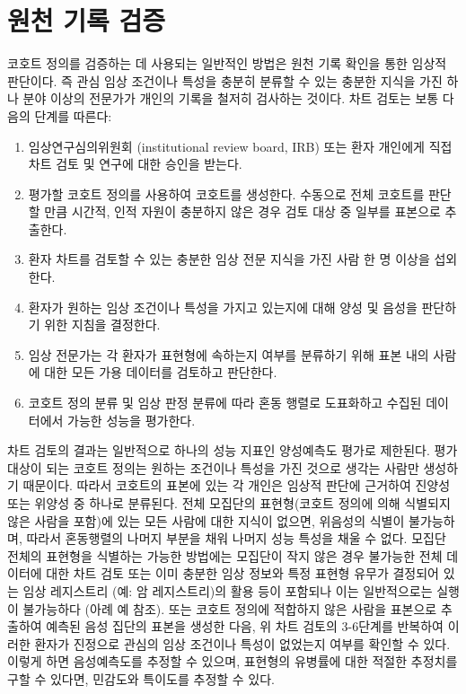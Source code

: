 \documentclass[11pt]{book}
\providecommand{\tightlist}{%
  \setlength{\itemsep}{0pt}\setlength{\parskip}{0pt}}
\theoremstyle{definition}
\theoremstyle{definition}
\theoremstyle{definition}
\theoremstyle{remark}
\begin{document}
\section{원천 기록 검증}\label{--}


코호트 정의를 검증하는 데 사용되는 일반적인 방법은 원천 기록 확인을 통한
임상적 판단이다. 즉 관심 임상 조건이나 특성을 충분히 분류할 수 있는
충분한 지식을 가진 하나 분야 이상의 전문가가 개인의 기록을 철저히
검사하는 것이다. 차트 검토는 보통 다음의 단계를 따른다:

\begin{enumerate}
\def\labelenumi{\arabic{enumi}.}
\tightlist
\item
  임상연구심의위원회 (institutional review board, IRB) 또는 환자
  개인에게 직접 차트 검토 및 연구에 대한 승인을 받는다.
\item
  평가할 코호트 정의를 사용하여 코호트를 생성한다. 수동으로 전체
  코호트를 판단할 만큼 시간적, 인적 자원이 충분하지 않은 경우 검토 대상
  중 일부를 표본으로 추출한다.
\item
  환자 차트를 검토할 수 있는 충분한 임상 전문 지식을 가진 사람 한 명
  이상을 섭외한다.
\item
  환자가 원하는 임상 조건이나 특성을 가지고 있는지에 대해 양성 및 음성을
  판단하기 위한 지침을 결정한다.
\item
  임상 전문가는 각 환자가 표현형에 속하는지 여부를 분류하기 위해 표본
  내의 사람에 대한 모든 가용 데이터를 검토하고 판단한다.
\item
  코호트 정의 분류 및 임상 판정 분류에 따라 혼동 행렬로 도표화하고
  수집된 데이터에서 가능한 성능을 평가한다.
\end{enumerate}

차트 검토의 결과는 일반적으로 하나의 성능 지표인 양성예측도 평가로
제한된다. 평가 대상이 되는 코호트 정의는 원하는 조건이나 특성을 가진
것으로 생각는 사람만 생성하기 때문이다. 따라서 코호트의 표본에 있는 각
개인은 임상적 판단에 근거하여 진양성 또는 위양성 중 하나로 분류된다.
전체 모집단의 표현형(코호트 정의에 의해 식별되지 않은 사람을 포함)에
있는 모든 사람에 대한 지식이 없으면, 위음성의 식별이 불가능하며, 따라서
혼동행렬의 나머지 부분을 채워 나머지 성능 특성을 채울 수 없다. 모집단
전체의 표현형을 식별하는 가능한 방법에는 모집단이 작지 않은 경우
불가능한 전체 데이터에 대한 차트 검토 또는 이미 충분한 임상 정보와 특정
표현형 유무가 결정되어 있는 임상 레지스트리 (예: 암 레지스트리)의 활용
등이 포함되나 이는 일반적으로는 실행이 불가능하다 (아례 예 참조). 또는
코호트 정의에 적합하지 않은 사람을 표본으로 추출하여 예측된 음성 집단의
표본을 생성한 다음, 위 차트 검토의 3-6단계를 반복하여 이러한 환자가
진정으로 관심의 임상 조건이나 특성이 없었는지 여부를 확인할 수 있다.
이렇게 하면 음성예측도를 추정할 수 있으며, 표현형의 유병률에 대한 적절한
추정치를 구할 수 있다면, 민감도와 특이도를 추정할 수 있다.
\end{document}
